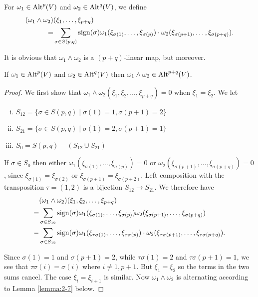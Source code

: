 \begin{definition}\label{definition:2-5}
  For $\omega_1\in\operatorname{Alt}^p(V)$ and $\omega_2\in\operatorname{Alt}^q(V)$, we define
  \begin{align*}
    (\omega_1\wedge\omega_2) & (\xi_1,\ldots,\xi_{p+q})                                                             \\
    =                        & \sum_{\sigma\in S(p,q)}\operatorname{sign}(\sigma)\omega_1(\xi_{\sigma(1)},\ldots,\xi_{\sigma(p)})
    \cdot\omega_2(\xi_{\sigma(p+1)},\ldots,\xi_{\sigma(p+q)}).
  \end{align*}

  It is obvious that $\omega_1\wedge\omega_2$ is a $(p+q)$-linear map, but moreover.
\end{definition}

\begin{lemma}\label{lemma:2-6}
  If $\omega_1\in\operatorname{Alt}^p(V)$ and $\omega_2\in\operatorname{Alt}^q(V)$ then $\omega_1\wedge\omega_2\in\operatorname{Alt}^{p+q}(V)$.
\end{lemma}

\begin{proof}
  We first show that $\omega_1\wedge\omega_2(\xi_1, \xi_2, \ldots, \xi_{p+q}) = 0$ when $\xi_1 = \xi_2$.
  We let
  \begin{enumerate}[(i)]
    \item $S_{12} = \{\sigma\in S(p, q) \mid \sigma(1) = 1, \sigma(p+1) = 2\}$
    \item $S_{21} = \{\sigma\in S(p, q) \mid \sigma(1) = 2, \sigma(p+1) = 1\}$
    \item $S_0 = S(p, q) - (S_{12} \cup S_{21})$
  \end{enumerate}

  If $\sigma\in S_0$ then either $\omega_1(\xi_{\sigma(1)}, \ldots, \xi_{\sigma(p)}) = 0$
  or $\omega_2(\xi_{\sigma(p+1)}, \ldots, \xi_{\sigma(p+q)}) = 0$, since $\xi_{\sigma(1)} = \xi_{\sigma(2)}$
  or $\xi_{\sigma(p+1)} = \xi_{\sigma(p+2)}$. Left composition with  the transposition $\tau = (1, 2)$ is a bijection
  $S_{12}\to S_{21}$. We therefore have
  \begin{align*}
      & (\omega_{1}\wedge\omega_{2})(\xi_{1},\xi_{2},\ldots,\xi_{p+q})                                                                                             \\
    = & \sum_{\sigma\in S_{12}}\operatorname{sign}(\sigma)\omega_1(\xi_{\sigma(1)},\ldots,\xi_{\sigma(p)})\omega_2(\xi_{\sigma(p+1)},\ldots,\xi_{\sigma(p+q)})                   \\
    - & \sum_{\sigma\in S_{12}}\operatorname{sign}(\sigma)\omega_1(\xi_{\tau\sigma(1)},\ldots,\xi_{\tau\sigma(p)})\cdot\omega_2(\xi_{\tau\sigma(p+1)},\ldots,\xi_{\tau\sigma(p+q)}).
  \end{align*}

  Since $\sigma(1) = 1$ and $\sigma(p+1) = 2$, while $\tau\sigma(1) = 2$ and $\tau\sigma(p+1) = 1$, we see that
  $\tau\sigma(i) = \sigma(i)$ where $i\neq 1, p+1$. But $\xi_1 = \xi_2$ so the terms in the two sums cancel.
  The case $\xi_i = \xi_{i+1}$ is similar. Now $\omega_1\wedge\omega_2$ is alternating according to Lemma \ref{lemma:2-7} below.
\end{proof}

